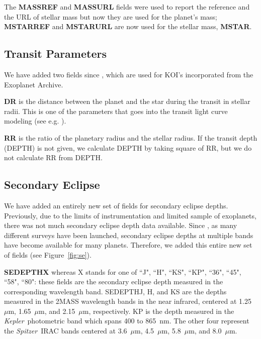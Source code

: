 \documentclass[11pt,preprint]{aastex}
\def\micron{$\mu$m}
\def\kepler{\textit{Kepler}}
\def\spitzer{\textit{Spitzer}}
\def\micron{$\mu$m}
\begin{document}
\begin{CJK*}{UTF8}{gbsn}
The {\bf MASSREF} and {\bf MASSURL} fields were used to report the
reference and the URL of stellar mass but now they are used for the planet's
mass; {\bf MSTARREF} and {\bf MSTARURL} are now used for the stellar
mass, {\bf MSTAR}.

\subsection{Transit Parameters}\label{sec:transit}

We have added two fields since \cite{Wright2011}, which are used for
KOI's incorporated from the Exoplanet Archive. 

{\bf DR} is the distance between the planet and the star during the
transit in stellar radii. This is one of the parameters that goes into
the transit light curve modeling (see e.g. \citealt{Batalha2013}).

{\bf RR} is the ratio of the planetary radius and the stellar
radius. If the transit depth (DEPTH) is not given, we calculate DEPTH
by taking square of RR, but we do not calculate RR from DEPTH.


\subsection{Secondary Eclipse}\label{sec:se}

We have added an entirely new set of fields for secondary
eclipse depths. Previously, due to the limits of instrumentation and limited
sample of exoplanets, there was not much secondary eclipse depth data
available. Since \cite{Wright2011}, as many different surveys have
been launched, secondary eclipse depths at multiple
bands have become available for many planets. Therefore, we added
this entire new set of fields (see Figure~\ref{fig:se}).

{\bf SEDEPTHX} whereas X stands for one of ``J", ``H", ``KS", ``KP",
``36", ``45", ``58", ``80": these fields are the secondary eclipse
depth measured in the corresponding wavelength band. SEDEPTHJ, H, and
KS are the depths measured in the 2MASS wavelength bands in the near
infrared, centered at 1.25~\micron, 1.65~\micron, and 2.15~\micron,
respectively. KP is the depth measured in the \kepler\ photometric
band which spans 400 to 865~nm. The other four represent the
\spitzer\ IRAC bands centered at 3.6~\micron, 4.5~\micron,
5.8~\micron, and 8.0~\micron.


\end{CJK*}
\end{document}
